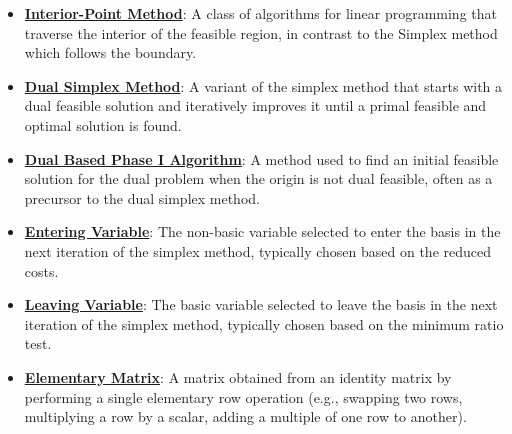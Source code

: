 \documentclass{article}%
\begin{document}
\begin{itemize}[leftmargin=*]
\item \href{https://www.math.purdue.edu/~yipn/421//2024-09-05-SimplexEfficiency.pdf#page=12}{\textbf{Interior-Point Method}}: A class of algorithms for linear programming that traverse the interior of the feasible region, in contrast to the Simplex method which follows the boundary.%
\item \href{https://www.math.purdue.edu/~yipn/421//2024-10-03-DualSimplexMatrix.pdf#page=2}{\textbf{Dual Simplex Method}}: A variant of the simplex method that starts with a dual feasible solution and iteratively improves it until a primal feasible and optimal solution is found.%
\item \href{https://www.math.purdue.edu/~yipn/421//2024-10-03-DualSimplexMatrix.pdf#page=5}{\textbf{Dual Based Phase I Algorithm}}: A method used to find an initial feasible solution for the dual problem when the origin is not dual feasible, often as a precursor to the dual simplex method.%
\item \href{https://www.math.purdue.edu/~yipn/421//2024-10-03-DualSimplexMatrix.pdf#page=9}{\textbf{Entering Variable}}: The non-basic variable selected to enter the basis in the next iteration of the simplex method, typically chosen based on the reduced costs.%
\item \href{https://www.math.purdue.edu/~yipn/421//2024-10-03-DualSimplexMatrix.pdf#page=10}{\textbf{Leaving Variable}}: The basic variable selected to leave the basis in the next iteration of the simplex method, typically chosen based on the minimum ratio test.%
\item \href{https://www.math.purdue.edu/~yipn/421//2024-10-03-DualSimplexMatrix.pdf#page=15}{\textbf{Elementary Matrix}}: A matrix obtained from an identity matrix by performing a single elementary row operation (e.g., swapping two rows, multiplying a row by a scalar, adding a multiple of one row to another).%
\end{itemize}

%
\end{document}
